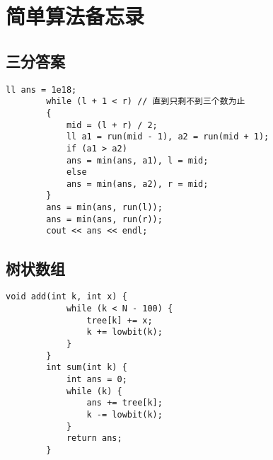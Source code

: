 \documentclass[12pt, a4paper]{ctexart}
\begin{document}
	\section{简单算法备忘录}
	\subsection{三分答案}
	\begin{lstlisting}[caption={}]
		ll ans = 1e18;
		while (l + 1 < r) // 直到只剩不到三个数为止
		{
			mid = (l + r) / 2;
			ll a1 = run(mid - 1), a2 = run(mid + 1);
			if (a1 > a2)
			ans = min(ans, a1), l = mid;
			else
			ans = min(ans, a2), r = mid;
		}
		ans = min(ans, run(l));
		ans = min(ans, run(r));
		cout << ans << endl;
	\end{lstlisting}
	\subsection{树状数组}
	\begin{lstlisting}[caption={}]
		void add(int k, int x) {
			while (k < N - 100) {
				tree[k] += x;
				k += lowbit(k);
			}
		}
		int sum(int k) {
			int ans = 0;
			while (k) {
				ans += tree[k];
				k -= lowbit(k);
			}
			return ans;
		}
	\end{lstlisting}
\end{document}
